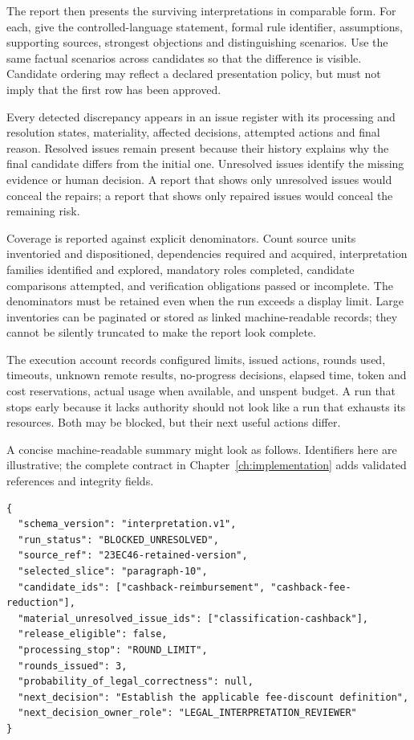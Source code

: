 \documentclass[12pt,a4paper,oneside,openany]{book}
\begin{document}
The report then presents the surviving interpretations in comparable form. For
each, give the controlled-language statement, formal rule identifier, assumptions,
supporting sources, strongest objections and distinguishing scenarios. Use the
same factual scenarios across candidates so that the difference is visible.
Candidate ordering may reflect a declared presentation policy, but must not imply
that the first row has been approved.

Every detected discrepancy appears in an issue register with its processing and
resolution states, materiality, affected decisions, attempted actions and final
reason. Resolved issues remain present because their history explains why the
final candidate differs from the initial one. Unresolved issues identify the
missing evidence or human decision. A report that shows only unresolved issues
would conceal the repairs; a report that shows only repaired issues would conceal
the remaining risk.

Coverage is reported against explicit denominators. Count source units inventoried
and dispositioned, dependencies required and acquired, interpretation families
identified and explored, mandatory roles completed, candidate comparisons
attempted, and verification obligations passed or incomplete. The denominators
must be retained even when the run exceeds a display limit. Large inventories
can be paginated or stored as linked machine-readable records; they cannot be
silently truncated to make the report look complete.

The execution account records configured limits, issued actions, rounds used,
timeouts, unknown remote results, no-progress decisions, elapsed time, token and
cost reservations, actual usage when available, and unspent budget. A run that
stops early because it lacks authority should not look like a run that exhausts
its resources. Both may be blocked, but their next useful actions differ.

A concise machine-readable summary might look as follows. Identifiers here are
illustrative; the complete contract in Chapter~\ref{ch:implementation} adds
validated references and integrity fields.

\begin{lstlisting}[caption={A blocked result preserves alternatives and the next decision.}]
{
  "schema_version": "interpretation.v1",
  "run_status": "BLOCKED_UNRESOLVED",
  "source_ref": "23EC46-retained-version",
  "selected_slice": "paragraph-10",
  "candidate_ids": ["cashback-reimbursement", "cashback-fee-reduction"],
  "material_unresolved_issue_ids": ["classification-cashback"],
  "release_eligible": false,
  "processing_stop": "ROUND_LIMIT",
  "rounds_issued": 3,
  "probability_of_legal_correctness": null,
  "next_decision": "Establish the applicable fee-discount definition",
  "next_decision_owner_role": "LEGAL_INTERPRETATION_REVIEWER"
}
\end{lstlisting}
\end{document}
